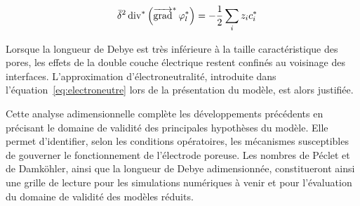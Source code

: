 \begin{equation}
\quad \bar{\delta}^2 \operatorname{div}^*\left(\mathop{\overrightarrow{\operatorname{grad}}}\nolimits^* \varphi_l^*\right) = -\frac{1}{2}\sum_i z_i c_i^*
\end{equation}

Lorsque la longueur de Debye est très inférieure à la taille caractéristique des pores, 
les effets de la double couche électrique restent confinés au voisinage des interfaces. 
L'approximation d'électroneutralité, introduite dans l'équation~\eqref{eq:electroneutre} lors de la 
présentation du modèle, est alors justifiée.

\bigskip

Cette analyse adimensionnelle complète les développements précédents en précisant le domaine 
de validité des principales hypothèses du modèle. Elle permet d’identifier, selon les conditions
 opératoires, les mécanismes susceptibles de gouverner le fonctionnement de l’électrode poreuse. 
 Les nombres de Péclet et de Damköhler, ainsi que la longueur de Debye adimensionnée, constitueront ainsi
  une grille de lecture pour les simulations numériques à venir et pour l’évaluation du domaine de validité des modèles réduits.
